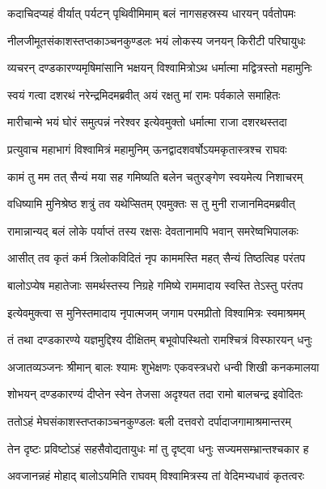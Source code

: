 
\twolineshloka
{कदाचिदप्यहं वीर्यात् पर्यटन् पृथिवीमिमाम्}
{बलं नागसहस्रस्य धारयन् पर्वतोपमः} %

\twolineshloka
{नीलजीमूतसंकाशस्तप्तकाञ्चनकुण्डलः}
{भयं लोकस्य जनयन् किरीटी परिघायुधः} %

\twolineshloka
{व्यचरन् दण्डकारण्यमृषिमांसानि भक्षयन्}
{विश्वामित्रोऽथ धर्मात्मा मद्वित्रस्तो महामुनिः} %

\twolineshloka
{स्वयं गत्वा दशरथं नरेन्द्रमिदमब्रवीत्}
{अयं रक्षतु मां रामः पर्वकाले समाहितः} %

\twolineshloka
{मारीचान्मे भयं घोरं समुत्पन्नं नरेश्वर}
{इत्येवमुक्तो धर्मात्मा राजा दशरथस्तदा} %

\twolineshloka
{प्रत्युवाच महाभागं विश्वामित्रं महामुनिम्}
{ऊनद्वादशवर्षोऽयमकृतास्त्रश्च राघवः} %

\twolineshloka
{कामं तु मम तत् सैन्यं मया सह गमिष्यति}
{बलेन चतुरङ्गेण स्वयमेत्य निशाचरम्} %

\twolineshloka
{वधिष्यामि मुनिश्रेष्ठ शत्रुं तव यथेप्सितम्}
{एवमुक्तः स तु मुनी राजानमिदमब्रवीत्} %

\twolineshloka
{रामान्नान्यद् बलं लोके पर्याप्तं तस्य रक्षसः}
{देवतानामपि भवान् समरेष्वभिपालकः} %

\twolineshloka
{आसीत् तव कृतं कर्म त्रिलोकविदितं नृप}
{काममस्ति महत् सैन्यं तिष्ठत्विह परंतप} %

\twolineshloka
{बालोऽप्येष महातेजाः समर्थस्तस्य निग्रहे}
{गमिष्ये राममादाय स्वस्ति तेऽस्तु परंतप} %

\twolineshloka
{इत्येवमुक्त्वा स मुनिस्तमादाय नृपात्मजम्}
{जगाम परमप्रीतो विश्वामित्रः स्वमाश्रमम्} %

\twolineshloka
{तं तथा दण्डकारण्ये यज्ञमुद्दिश्य दीक्षितम्}
{बभूवोपस्थितो रामश्चित्रं विस्फारयन् धनुः} %

\twolineshloka
{अजातव्यञ्जनः श्रीमान् बालः श्यामः शुभेक्षणः}
{एकवस्त्रधरो धन्वी शिखी कनकमालया} %

\twolineshloka
{शोभयन् दण्डकारण्यं दीप्तेन स्वेन तेजसा}
{अदृश्यत तदा रामो बालचन्द्र इवोदितः} %

\twolineshloka
{ततोऽहं मेघसंकाशस्तप्तकाञ्चनकुण्डलः}
{बली दत्तवरो दर्पादाजगामाश्रमान्तरम्} %

\twolineshloka
{तेन दृष्टः प्रविष्टोऽहं सहसैवोद्यतायुधः}
{मां तु दृष्ट्वा धनुः सज्यमसम्भ्रान्तश्चकार ह} %

\twolineshloka
{अवजानन्नहं मोहाद् बालोऽयमिति राघवम्}
{विश्वामित्रस्य तां वेदिमभ्यधावं कृतत्वरः} %

